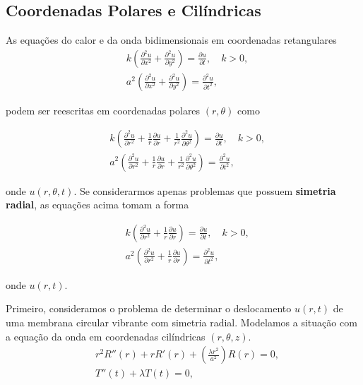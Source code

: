 \documentclass{article}
\theoremstyle{plain}
\theoremstyle{definition}
\theoremstyle{remark}
\begin{document}
\subsection{Coordenadas Polares e Cilíndricas}

As equações do calor e da onda bidimensionais em coordenadas retangulares
\begin{align}
    &k\left(\frac{\partial^2 u}{\partial x^2} + \frac{\partial^2 u}{\partial y^2}\right) = \frac{\partial u}{\partial t}, \quad k>0, \\
    &a^2\left(\frac{\partial^2 u}{\partial x^2} + \frac{\partial^2 u}{\partial y^2}\right) = \frac{\partial^2 u}{\partial t^2},
\end{align}

\noindent podem ser reescritas em coordenadas polares \((r, \theta)\) como

\begin{align}
    &k\left(\frac{\partial^2 u}{\partial r^2} + \frac{1}{r} \frac{\partial u}{\partial r} + \frac{1}{r^2} \frac{\partial^2 u}{\partial \theta^2}\right) = \frac{\partial u}{\partial t}, \quad k>0, \\
    &a^2\left(\frac{\partial^2 u}{\partial r^2} + \frac{1}{r} \frac{\partial u}{\partial r} + \frac{1}{r^2} \frac{\partial^2 u}{\partial \theta^2}\right) = \frac{\partial^2 u}{\partial t^2},
\end{align}

\noindent onde \(u(r, \theta, t)\). Se considerarmos apenas problemas que possuem \textbf{simetria radial}, as equações acima tomam a forma

\begin{align}
    &k\left(\frac{\partial^2 u}{\partial r^2} + \frac{1}{r} \frac{\partial u}{\partial r}\right) = \frac{\partial u}{\partial t}, \quad k>0, \\
    &a^2\left(\frac{\partial^2 u}{\partial r^2} + \frac{1}{r} \frac{\partial u}{\partial r}\right) = \frac{\partial^2 u}{\partial t^2},
\end{align}

\noindent onde \(u(r,t)\).

Primeiro, consideramos o problema de determinar o deslocamento \(u(r,t)\) de uma membrana circular vibrante com simetria radial. Modelamos a situação com a equação da onda em coordenadas cilíndricas \((r, \theta, z)\).
    \begin{align}
        &r^2 R''(r) + r R'(r) + \left(\frac{\lambda r^2}{a^2}\right) R(r) = 0, \\
        &T''(t) + \lambda T(t) = 0,
    \end{align}
\end{document}
